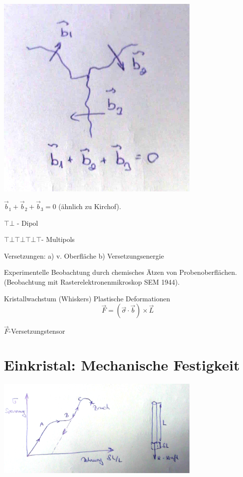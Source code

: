 \includegraphics[width=0.75\textwidth]{kap04_04.png}

\(\vec b_1+\vec b_2+\vec b_3=0\) (ähnlich zu Kirchof). 

\(\top \bot\) - Dipol

\(\top \bot\top \bot \top \bot \top\)- Multipols

Versetzungen: a) v. Oberfläche b) Versetzungsenergie

Experimentelle Beobachtung durch chemisches Ätzen von
Probenoberflächen. (Beobachtung mit Rasterelektronenmikroskop SEM
1944).

Kristallwachstum (Whiskers) Plastische Deformationen
\[ \vec F = (\vec \sigma\cdot \vec b) \times \vec L \]

\(\vec F\)-Versetzungstensor

\section{Einkristal: Mechanische Festigkeit}

\includegraphics[width=0.75\textwidth]{kap04_05.png}

